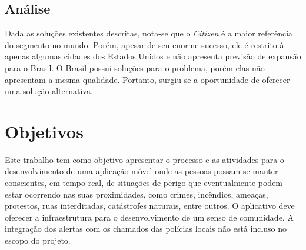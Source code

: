 \FloatBarrier

\subsection{Análise}

Dada as soluções existentes descritas, nota-se que o \emph{Citizen} é a maior referência do segmento no mundo. Porém, apesar de seu enorme sucesso, ele é restrito à apenas algumas cidades dos Estados Unidos e não apresenta previsão de expansão para o Brasil. O Brasil possui soluções para o problema, porém elas não apresentam a mesma qualidade. Portanto, surgiu-se a oportunidade de oferecer uma solução alternativa.

\section{Objetivos}



Este trabalho tem como objetivo apresentar o processo e as atividades para o desenvolvimento de uma aplicação móvel onde as pessoas possam se manter conscientes, em tempo real, de situações de perigo que eventualmente podem estar ocorrendo nas suas proximidades, como crimes, incêndios, ameaças, protestos, ruas interditadas, catástrofes naturais, entre outros. O aplicativo deve oferecer a infraestrutura para o desenvolvimento de um senso de comunidade. A integração dos alertas com os chamados das polícias locais não está incluso no escopo do projeto.
